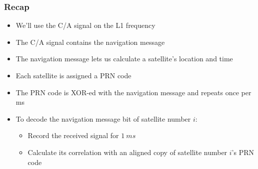 \documentclass[aspectratio=169]{beamer}
\begin{document}
\begin{frame}
  \frametitle{Recap}

  \begin{itemize}
    \item<2-> We'll use the C/A signal on the L1 frequency
    
    \item<3-> The C/A signal contains the navigation message
    
    \item<4-> The navigation message lets us calculate a satellite's location and time
    
    \item<5-> Each satellite is assigned a PRN code
    
    \item<6-> The PRN code is XOR-ed with the navigation message and repeats once per ms
    
    \item<7-> To decode the navigation message bit of satellite number $i$:
    
    \begin{itemize}
      \item<8-> Record the received signal for $\qty{1}{ms}$
      
      \item<9-> Calculate its correlation with an aligned copy of satellite number $i$'s PRN code
    \end{itemize}
  \end{itemize}
\end{frame}
\end{document}
